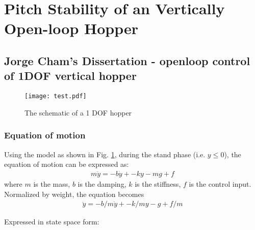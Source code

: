 \section{Pitch Stability of an Vertically Open-loop Hopper}

\subsection{Jorge Cham's Dissertation - openloop control of 1DOF vertical hopper }
\begin{figure}[h]
\centering

\texttt{[image: test.pdf]} 
\caption{The schematic of a 1 DOF hopper \cite{Cham2002}}
\label{fig.1DOF-Hopper}
\end{figure}


%
\subsubsection{Equation of motion}
Using the model as shown in Fig. \ref{fig.1DOF-Hopper}, during the stand phase (i.e. $y\leq 0$), the equation of motion can be expressed as:
\begin{align*}
m \ddot y = -b\dot y +-ky -mg + f
\end{align*}
\noindent where $m$ is the mass, $b$ is the damping, $k$ is the stiffness, $f$ is the control input.
Normalized by weight, the equation becomes
\begin{align*}
 \ddot y = -b/m\dot y +-k/my -g + f/m
\end{align*}

\noindent Expressed in state space form:

